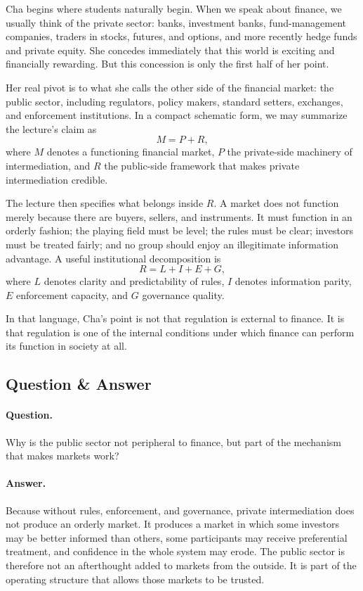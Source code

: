 Cha begins where students naturally begin. When we speak about finance, we usually think of the private sector: banks, investment banks, fund-management companies, traders in stocks, futures, and options, and more recently hedge funds and private equity. She concedes immediately that this world is exciting and financially rewarding. But this concession is only the first half of her point.

Her real pivot is to what she calls the other side of the financial market: the public sector, including regulators, policy makers, standard setters, exchanges, and enforcement institutions. In a compact schematic form, we may summarize the lecture's claim as
\begin{equation}
M = P + R,
\end{equation}
where \(M\) denotes a functioning financial market, \(P\) the private-side machinery of intermediation, and \(R\) the public-side framework that makes private intermediation credible.

The lecture then specifies what belongs inside \(R\). A market does not function merely because there are buyers, sellers, and instruments. It must function in an orderly fashion; the playing field must be level; the rules must be clear; investors must be treated fairly; and no group should enjoy an illegitimate information advantage. A useful institutional decomposition is
\begin{equation}
R = L + I + E + G,
\end{equation}
where \(L\) denotes clarity and predictability of rules, \(I\) denotes information parity, \(E\) enforcement capacity, and \(G\) governance quality.

In that language, Cha's point is not that regulation is external to finance. It is that regulation is one of the internal conditions under which finance can perform its function in society at all.

\subsection{Question \& Answer}

\paragraph{Question.} Why is the public sector not peripheral to finance, but part of the mechanism that makes markets work?

\paragraph{Answer.} Because without rules, enforcement, and governance, private intermediation does not produce an orderly market. It produces a market in which some investors may be better informed than others, some participants may receive preferential treatment, and confidence in the whole system may erode. The public sector is therefore not an afterthought added to markets from the outside. It is part of the operating structure that allows those markets to be trusted.

